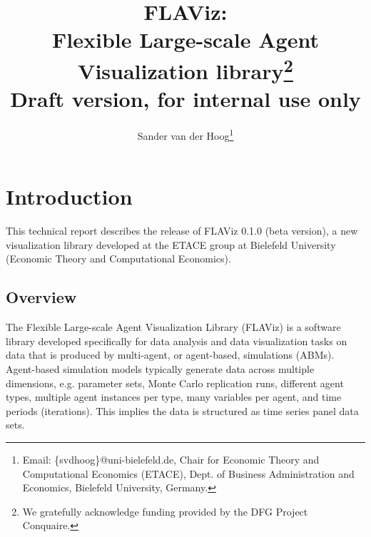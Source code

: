 \documentclass[10pt,a4paper]{article}
\begin{document}
\makeatletter

\renewcommand*{\@fnsymbol}[1]{\ensuremath{\ifcase#1\or \star\or a\or b\or
   \mathsection\or \mathparagraph\or \|\or \star\star\or \dagger\dagger
   \or \ddagger\ddagger \else\@ctrerr\fi}}

\makeatother

\title{FLAViz:\\Flexible Large-scale Agent Visualization library\thanks{We gratefully acknowledge funding provided by the DFG Project Conquaire.}\\\sc Draft version, for internal use only}

\author{Sander van der Hoog\thanks{Email: \{svdhoog\}@uni-bielefeld.de, Chair for Economic Theory and Computational Economics (ETACE), Dept. of Business Administration and Economics, Bielefeld University, Germany.}}


\maketitle


\clearpage
\tableofcontents

\clearpage
\section{Introduction}
This technical report describes the release of FLAViz 0.1.0 (beta version), a new visualization library developed at the ETACE group at Bielefeld University (Economic Theory and Computational Economics). 

\subsection{Overview}
\label{Section:1}

The Flexible Large-scale Agent Visualization Library (FLAViz) is a software library developed specifically for data analysis and data visualization tasks on data that is produced by multi-agent, or agent-based, simulations (ABMs). Agent-based simulation models typically generate data across multiple dimensions, e.g. parameter sets, Monte Carlo replication runs, different agent types, multiple agent instances per type, many variables per agent, and time periods (iterations). This implies the data is structured as time series panel data sets.
\end{document}
